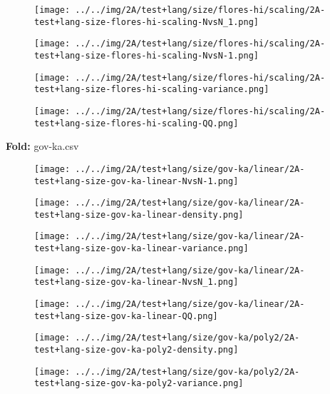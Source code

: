 \begin{figure}[H]
\centering	\texttt{[image: ../../img/2A/test+lang/size/flores-hi/scaling/2A-test+lang-size-flores-hi-scaling-NvsN\_1.png]}
\end{figure}
\begin{figure}[H]
\centering	\texttt{[image: ../../img/2A/test+lang/size/flores-hi/scaling/2A-test+lang-size-flores-hi-scaling-NvsN-1.png]}
\end{figure}
\begin{figure}[H]
\centering	\texttt{[image: ../../img/2A/test+lang/size/flores-hi/scaling/2A-test+lang-size-flores-hi-scaling-variance.png]}
\end{figure}
\begin{figure}[H]
\centering	\texttt{[image: ../../img/2A/test+lang/size/flores-hi/scaling/2A-test+lang-size-flores-hi-scaling-QQ.png]}
\end{figure}
\textbf{Fold:} gov-ka.csv
\begin{figure}[H]
\centering	\texttt{[image: ../../img/2A/test+lang/size/gov-ka/linear/2A-test+lang-size-gov-ka-linear-NvsN-1.png]}
\end{figure}
\begin{figure}[H]
\centering	\texttt{[image: ../../img/2A/test+lang/size/gov-ka/linear/2A-test+lang-size-gov-ka-linear-density.png]}
\end{figure}
\begin{figure}[H]
\centering	\texttt{[image: ../../img/2A/test+lang/size/gov-ka/linear/2A-test+lang-size-gov-ka-linear-variance.png]}
\end{figure}
\begin{figure}[H]
\centering	\texttt{[image: ../../img/2A/test+lang/size/gov-ka/linear/2A-test+lang-size-gov-ka-linear-NvsN\_1.png]}
\end{figure}
\begin{figure}[H]
\centering	\texttt{[image: ../../img/2A/test+lang/size/gov-ka/linear/2A-test+lang-size-gov-ka-linear-QQ.png]}
\end{figure}
\begin{figure}[H]
\centering	\texttt{[image: ../../img/2A/test+lang/size/gov-ka/poly2/2A-test+lang-size-gov-ka-poly2-density.png]}
\end{figure}
\begin{figure}[H]
\centering	\texttt{[image: ../../img/2A/test+lang/size/gov-ka/poly2/2A-test+lang-size-gov-ka-poly2-variance.png]}
\end{figure}
